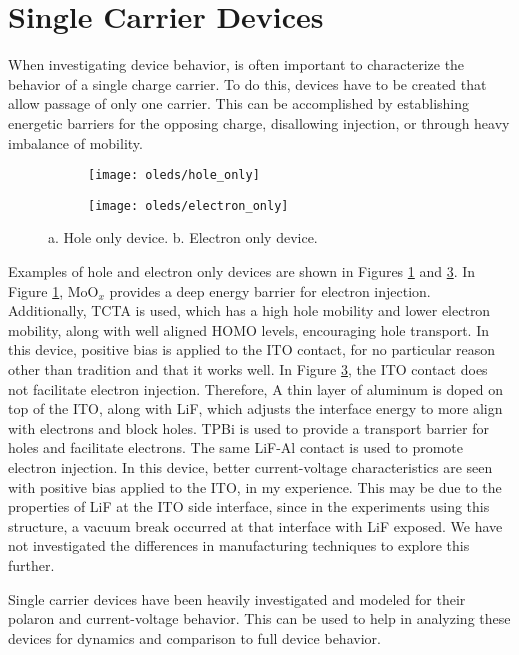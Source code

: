 \documentclass[../thesis.tex]{subfiles}
\begin{document}
\section{Single Carrier Devices}
When investigating device behavior, is often important to characterize the behavior of a single charge carrier.\supercite{Reineke2008,Reineke2007,Erickson2011}
To do this, devices have to be created that allow passage of only one carrier.
This can be accomplished by establishing energetic barriers for the opposing charge, disallowing injection, or through heavy imbalance of mobility.
\begin{figure}[ht]
\centering
\begin{subfigure}{.4\textwidth}
\texttt{[image: oleds/hole\_only]}
\caption{}
\label{fig:oleds_hole_only}
\end{subfigure}
\begin{subfigure}{.4\textwidth}
\texttt{[image: oleds/electron\_only]}
\caption{}
\label{fig:oleds_electron_only}
\end{subfigure}
\caption{a. Hole only device. b. Electron only device.}
\end{figure}
Examples of hole and electron only devices are shown in Figures \ref{fig:oleds_hole_only} and \ref{fig:oleds_electron_only}.
In Figure \ref{fig:oleds_hole_only}, MoO$_x$ provides a deep energy barrier for electron injection.
Additionally, TCTA is used, which has a high hole mobility and lower electron mobility, along with well aligned HOMO levels, encouraging hole transport.
In this device, positive bias is applied to the ITO contact, for no particular reason other than tradition and that it works well.
In Figure \ref{fig:oleds_electron_only}, the ITO contact does not facilitate electron injection.  
Therefore, A thin layer of aluminum is doped on top of the ITO, along with LiF, which adjusts the interface energy to more align with electrons and block holes.
TPBi is used to provide a transport barrier for holes and facilitate electrons.  
The same LiF-Al contact is used to promote electron injection.
In this device, better current-voltage characteristics are seen with positive bias applied to the ITO, in my experience.
This may be due to the properties of LiF at the ITO side interface, since in the experiments using this structure, a vacuum break occurred at that interface with LiF exposed.
We have not investigated the differences in manufacturing techniques to explore this further.

Single carrier devices have been heavily investigated and modeled for their polaron and current-voltage behavior.\supercite{Pope1999,Mark1962,Lampert2002a}
This can be used to help in analyzing these devices for dynamics and comparison to full device behavior.
\end{document}
